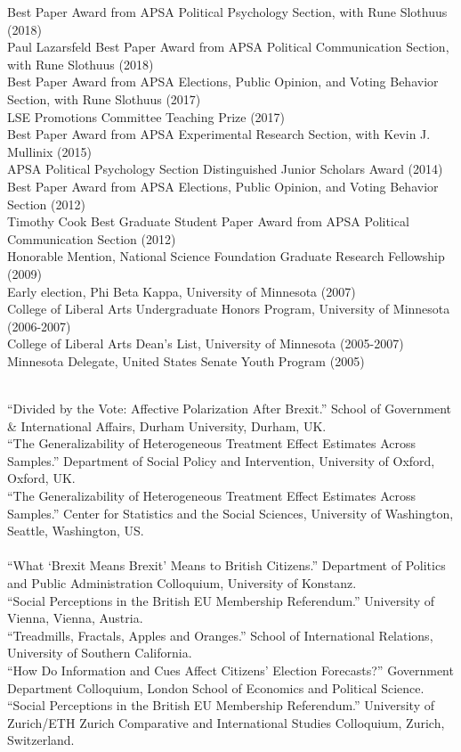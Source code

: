 \documentclass[12pt]{article}
\renewcommand{\section}[1]{\pagebreak[3]%
    \llap{\scshape\smash{\parbox[t]{\marginparwidth}{\raggedright {\color{lg}#1}}}}%
    \vspace{-\baselineskip}\par}
\newcommand{\topic}[1]{\pagebreak[3]\indent {\color{lg}{\footnotesize #1 }}\\}
\newcommand{\entry}[1]{\indent {\color{lg}\guillemotright}\hspace{2pt}#1\vspace{.25em}\\}
\begin{document}
\section{Honors \&\\Awards}
	\entry{Best Paper Award from APSA Political Psychology Section, with Rune Slothuus (2018)}
    \entry{Paul Lazarsfeld Best Paper Award from APSA Political Communication Section, with Rune Slothuus (2018)}
    \entry{Best Paper Award from APSA Elections, Public Opinion, and Voting Behavior Section, with Rune Slothuus (2017)}
	\entry{LSE Promotions Committee Teaching Prize (2017)}
    \entry{Best Paper Award from APSA Experimental Research Section, with Kevin J. Mullinix (2015)}
	\entry{APSA Political Psychology Section Distinguished Junior Scholars Award (2014)}
	\entry{Best Paper Award from APSA Elections, Public Opinion, and Voting Behavior Section (2012)}
	\entry{Timothy Cook Best Graduate Student Paper Award from APSA Political Communication Section (2012)}
	\entry{Honorable Mention, National Science Foundation Graduate Research Fellowship (2009)}
	\entry{Early election, Phi Beta Kappa, University of Minnesota (2007)}
	\entry{College of Liberal Arts Undergraduate Honors Program, University of Minnesota (2006-2007)}
	\entry{College of Liberal Arts Dean's List, University of Minnesota (2005-2007)}
	\entry{Minnesota Delegate, United States Senate Youth Program (2005)}

\section{Invited\\Presentations\\\& Conference\\Papers}
	\topic{Invited Presentations (2018)}
    \entry{``Divided by the Vote: Affective Polarization After Brexit.'' School of Government \& International Affairs, Durham University, Durham, UK.}
    \entry{``The Generalizability of Heterogeneous Treatment Effect Estimates Across Samples.'' Department of Social Policy and Intervention, University of Oxford, Oxford, UK.}
    \entry{``The Generalizability of Heterogeneous Treatment Effect Estimates Across Samples.'' Center for Statistics and the Social Sciences, University of Washington, Seattle, Washington, US.}

    \topic{Invited Presentations (2017)}
    \entry{``What `Brexit Means Brexit' Means to British Citizens.'' Department of Politics and Public Administration Colloquium, University of Konstanz.}
    \entry{``Social Perceptions in the British EU Membership Referendum.'' University of Vienna, Vienna, Austria.}
    \entry{``Treadmills, Fractals, Apples and Oranges.'' School of International Relations, University of Southern California.}
    \entry{``How Do Information and Cues Affect Citizens' Election Forecasts?'' Government Department Colloquium, London School of Economics and Political Science.}
    \entry{``Social Perceptions in the British EU Membership Referendum.'' University of Zurich/ETH Zurich Comparative and International Studies Colloquium, Zurich, Switzerland.}
	
\end{document}
